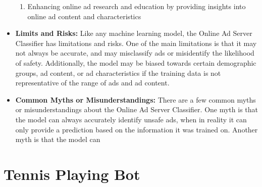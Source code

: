 \begin{itemize}
\begin{enumerate}
            \item Enhancing online ad research and education by providing insights into online ad content and characteristics
        \end{enumerate}
    \item \textbf{Limits and Risks:} Like any machine learning model, the Online Ad Server Classifier has limitations and risks. One of the main limitations is that it may not always be accurate, and may misclassify ads or misidentify the likelihood of safety. Additionally, the model may be biased towards certain demographic groups, ad content, or ad characteristics if the training data is not representative of the range of ads and ad content.
    \item \textbf{Common Myths or Misunderstandings:} There are a few common myths or misunderstandings about the Online Ad Server Classifier. One myth is that the model can always accurately identify unsafe ads, when in reality it can only provide a prediction based on the information it was trained on. Another myth is that the model can
\end{itemize}

\section{Tennis Playing Bot}

